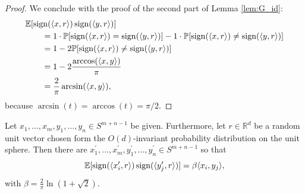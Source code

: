 \begin{proof}
	\noindent We conclude with the proof of the second part of Lemma \ref{lem:G_id}: 
	\begin{align*}
		&\mathbb{E}[\operatorname{sign}(\langle{x},{r}\rangle) \operatorname{sign}(\langle{y},{r}\rangle)] \\
		&\qquad= 1\cdot\mathbb{P}[\operatorname{sign}(\langle{x},{r}\rangle) = \operatorname{sign} (\langle{y},{r}\rangle )] - 1\cdot \mathbb{P}[\operatorname{sign}(\langle{x},{r}\rangle) \neq \operatorname{sign}(\langle{y},{r}\rangle)] \\
		&\qquad= 1 - 2\mathbb{P}[\operatorname{sign}(\langle{x},{r}\rangle) \neq \operatorname{sign}(\langle{y},{r}\rangle)] \\
		&\qquad= 1 - 2 \frac{\arccos(\langle{x},{y}\rangle)}{\pi} \\
		&\qquad= \frac{2}{\pi} \arcsin(\langle{x},{y}\rangle),
	\end{align*}
	because $\arcsin (t) = \arccos(t) = \pi/2$.
\end{proof}

\begin{lemma}\label{lem:krivines_trick}
	Let $x_1,\dots,x_m,y_1,\dots,y_n\in S^{m+n-1}$ be given. Furthermore, let $r\in\mathbb{R}^d$ be a random unit vector chosen form the $O(d)$-invariant probability distribution on the unit sphere. Then there are $x_1^\prime,\dots,x_m^\prime, y_1^\prime,\dots,y_n^\prime\in S^{m+n-1}$ so that
	\begin{equation}
		\mathbb{E}[\operatorname{sign}(\langle{x_i^\prime},{r}\rangle)\operatorname{sign}(\langle{y_j^\prime},{r}\rangle)] = \beta \langle{x_i},{y_j}\rangle,
		\label{eq:krivines_trick}
	\end{equation}		
	with $\beta = \frac{2}{\pi} \ln (1+\sqrt{2}).$
\end{lemma}

